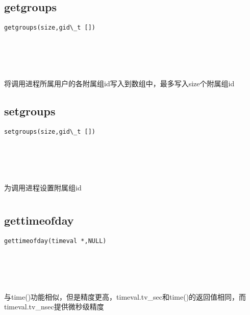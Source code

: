 \documentclass[10pt,a4paper]{article}
\begin{document}
\subsection{getgroups}
\begin{spacing}{2.0}
\lstset{language=C,numbers=none}
\begin{lstlisting}
getgroups(size,gid\_t [])
\end{lstlisting}
{\large\color[rgb]{0.2,0.4,0.6}{size:}} \\
{\large\color[rgb]{0.2,0.4,0.6}{[]:}}
\paragraph{ \ \ }将调用进程所属用户的各附属组id写入到数组中，最多写入size个附属组id
\end{spacing}

\subsection{setgroups}
\begin{spacing}{2.0}
\lstset{language=C,numbers=none}
\begin{lstlisting}
setgroups(size,gid\_t [])
\end{lstlisting}
{\large\color[rgb]{0.2,0.4,0.6}{size:}} \\
{\large\color[rgb]{0.2,0.4,0.6}{[]:}}
\paragraph{ \ \ }为调用进程设置附属组id
\end{spacing}

\section{\color[rgb]{0.2,0.4,0.6}{时间}}
\subsection{gettimeofday}
\begin{spacing}{2.0}
\lstset{language=C,numbers=none}
\begin{lstlisting}
gettimeofday(timeval *,NULL)
\end{lstlisting}
{\large\color[rgb]{0.2,0.4,0.6}{*:}} \\
{\large\color[rgb]{0.2,0.4,0.6}{NULL:}}
\paragraph{ \ \ }与time()功能相似，但是精度更高，timeval.tv\_sec和time()的返回值相同，而timeval.tv\_nsec提供微秒级精度
\end{spacing}
\end{document}

